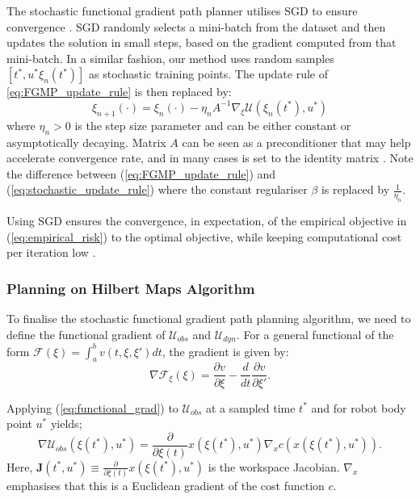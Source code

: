 \documentclass[letterpaper, 10 pt, conference]{ieeeconf}  %
\begin{document}
The stochastic functional gradient path planner utilises SGD to ensure convergence \cite{bottou2016optimization}. SGD randomly selects a mini-batch from the dataset and then updates the solution in small steps, based on the gradient computed from that mini-batch. In a similar fashion, our method uses random samples $[t^*, u^* \xi_n(t^*)]$ as stochastic training points. The update rule of \ref{eq:FGMP_update_rule} is then replaced by:   
\begin{equation}\label{eq:stochastic_update_rule}
\xi_{n+1}(\cdot)= \xi_n(\cdot) - \eta_n A^{-1}\nabla_\xi\mathcal{U}(\xi_n(t^*),u^*)
\end{equation}
where $\eta_n > 0$ is the step size parameter and can be either constant or asymptotically decaying. Matrix $A$ can be seen as a preconditioner that may help accelerate convergence rate, and in many cases is set to the identity matrix \cite{bottou2016optimization}. Note the difference between (\ref{eq:FGMP_update_rule}) and (\ref{eq:stochastic_update_rule}) where the constant regulariser $\beta$ is replaced by $\frac{1}{\eta_n}$.

Using SGD ensures the convergence, in expectation, of the empirical objective in (\ref{eq:empirical_risk}) to the optimal objective, while keeping computational cost per iteration low \cite{bottou2016optimization}.   
\subsubsection{Planning on Hilbert Maps Algorithm}
 
To finalise the stochastic functional gradient path planning algorithm, we need to define the functional gradient of $\mathcal{U}_{obs}$ and $\mathcal{U}_{dyn}$. For a general functional of the form $\mathcal{F}(\xi)=\int_{a}^{b} v(t,\xi,\xi') dt$, the gradient is given by:
\begin{equation}\label{eq:functional_grad}
	\nabla\mathcal{F}_\xi(\xi)=\frac{\partial v}{\partial\xi} - \frac{d}{dt}\frac{\partial v}{\partial\xi'}.
\end{equation}

Applying (\ref{eq:functional_grad}) to $\mathcal{U}_{obs}$ at a sampled time $t^*$ and for robot body point $u^*$ yields;
\begin{equation}\label{eq:d_U_obs-final}
\nabla\mathcal{U}_{obs}(\xi(t^*),u^*)=\frac{\partial}{\partial \xi(t)}x(\xi(t^*),u^*) \nabla_x c\left(x\left(\xi(t^*),u^*\right)\right).
\end{equation}
Here, $\boldsymbol{J}(t^*,u^*) \equiv \frac{\partial}{\partial \xi(t)}x(\xi(t^*),u^*)$ is the workspace Jacobian. $\nabla_x$ emphasises that this is a Euclidean gradient of the cost function $c$.
\end{document}
